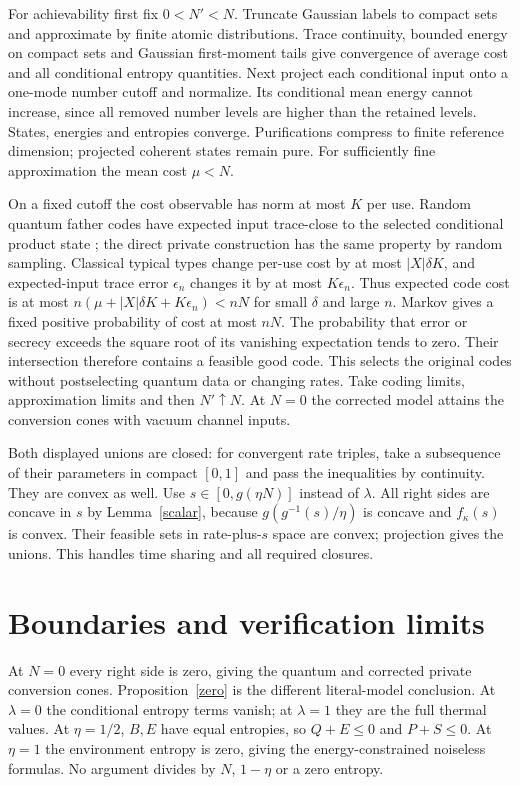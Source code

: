 \documentclass[11pt]{article}
\begin{document}
For achievability first fix $0<N'<N$. Truncate Gaussian labels
to compact sets and approximate by finite atomic distributions.
Trace continuity, bounded energy on compact sets and Gaussian
first-moment tails give convergence of average cost and all
conditional entropy quantities. Next project each conditional input
onto a one-mode number cutoff and normalize.
Its conditional mean energy cannot increase, since all removed
number levels are higher than the retained levels. States,
energies and entropies converge. Purifications compress to finite
reference dimension; projected coherent states remain pure.
For sufficiently fine approximation the mean cost $\mu<N$.

On a fixed cutoff the cost observable has norm at most $K$ per
use. Random quantum father codes have expected input trace-close
to the selected conditional product state
\cite[Propositions 2--3]{CEF}; the direct private construction
has the same property by random sampling.
Classical typical types change per-use cost by at most
$|X|\delta K$, and expected-input trace error $\epsilon_n$
changes it by at most $K\epsilon_n$.
Thus expected code cost is at most
$n(\mu+|X|\delta K+K\epsilon_n)<nN$ for small $\delta$ and
large $n$. Markov gives a fixed positive probability of cost
at most $nN$. The probability that error or secrecy exceeds
the square root of its vanishing expectation tends to zero.
Their intersection therefore contains a feasible good code.
This selects the original codes without postselecting quantum
data or changing rates. Take coding limits, approximation limits
and then $N'\uparrow N$. At $N=0$ the corrected model attains
the conversion cones with vacuum channel inputs.

Both displayed unions are closed: for convergent rate triples,
take a subsequence of their parameters in compact $[0,1]$ and
pass the inequalities by continuity. They are convex as well.
Use $s\in[0,g(\eta N)]$ instead of $\lambda$.
All right sides are concave in $s$ by Lemma~\ref{scalar},
because $g(g^{-1}(s)/\eta)$ is concave and $f_\kappa(s)$ is
convex. Their feasible sets in rate-plus-$s$ space are convex;
projection gives the unions. This handles time sharing and
all required closures.

\section{Boundaries and verification limits}
At $N=0$ every right side is zero, giving the quantum and
corrected private conversion cones. Proposition~\ref{zero}
is the different literal-model conclusion.
At $\lambda=0$ the conditional entropy terms vanish; at
$\lambda=1$ they are the full thermal values.
At $\eta=1/2$, $B,E$ have equal entropies, so $Q+E\le0$
and $P+S\le0$.
At $\eta=1$ the environment entropy is zero, giving the
energy-constrained noiseless formulas.
No argument divides by $N$, $1-\eta$ or a zero entropy.
\end{document}
